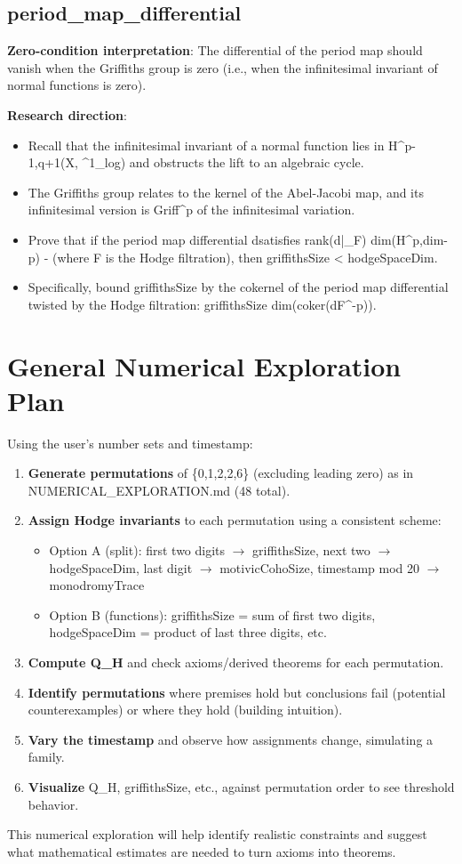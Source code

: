 \documentclass[11pt]{article}
\begin{document}
\subsection{period\_map\_differential}
\textbf{Zero-condition interpretation}: The differential of the period map should vanish when the Griffiths group is zero (i.e., when the infinitesimal invariant of normal functions is zero).

\textbf{Research direction}:
\begin{itemize}
\item Recall that the infinitesimal invariant \delta\nu of a normal function \nu lies in H^{p-1,q+1}(X, \Omega^1\_log) and obstructs the lift to an algebraic cycle.
\item The Griffiths group relates to the kernel of the Abel-Jacobi map, and its infinitesimal version is Griff^{p} of the infinitesimal variation.
\item Prove that if the period map differential d\pi satisfies rank(d\pi|_F) \geq dim(H^{p,dim-p}) - \varepsilon (where F is the Hodge filtration), then griffithsSize < \varepsilon \cdot hodgeSpaceDim.
\item Specifically, bound griffithsSize by the cokernel of the period map differential twisted by the Hodge filtration: griffithsSize \leq dim(coker(d\pi \otimes F^{-p})).
\end{itemize}

\section{General Numerical Exploration Plan}

Using the user's number sets and timestamp:

\begin{enumerate}
\item \textbf{Generate permutations} of \{0,1,2,2,6\} (excluding leading zero) as in NUMERICAL\_EXPLORATION.md (48 total).
\item \textbf{Assign Hodge invariants} to each permutation using a consistent scheme:
  \begin{itemize}
  \item Option A (split): first two digits $\rightarrow$ griffithsSize, next two $\rightarrow$ hodgeSpaceDim, last digit $\rightarrow$ motivicCohoSize, timestamp mod 20 $\rightarrow$ monodromyTrace
  \item Option B (functions): griffithsSize = sum of first two digits, hodgeSpaceDim = product of last three digits, etc.
  \end{itemize}
\item \textbf{Compute Q\_H} and check axioms/derived theorems for each permutation.
\item \textbf{Identify permutations} where premises hold but conclusions fail (potential counterexamples) or where they hold (building intuition).
\item \textbf{Vary the timestamp} and observe how assignments change, simulating a family.
\item \textbf{Visualize} Q\_H, griffithsSize, etc., against permutation order to see threshold behavior.
\end{enumerate}

This numerical exploration will help identify realistic constraints and suggest what mathematical estimates are needed to turn axioms into theorems.
\end{document}
